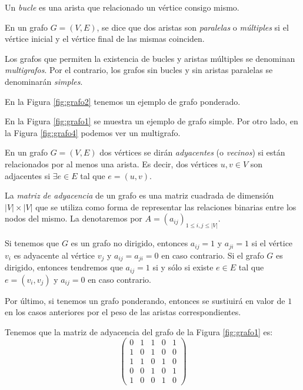 \begin{definition}
Un \emph{bucle} es una arista que relacionado un vértice consigo mismo.
\end{definition}

\begin{definition}
En un grafo $G=(V,E)$, se dice que dos aristas son \emph{paralelas} o \emph{múltiples} si el vértice inicial y el vértice final de las mismas coinciden. 

Los grafos que permiten la existencia de bucles y aristas múltiples se denominan \emph{multigrafos}. Por el contrario, los grafos sin bucles y sin aristas paralelas se denominarán \emph{simples}.
\end{definition}

\begin{exampleth}
En la Figura \ref{fig:grafo2} tenemos un ejemplo de grafo ponderado.

En la Figura \ref{fig:grafo1} se muestra un ejemplo de grafo simple. Por otro lado, en la Figura \ref{fig:grafo4} podemos ver un multigrafo.
\end{exampleth}

\begin{definition}\label{def:adjacency}
En un grafo $G=(V,E)$ dos vértices se dirán \emph{adyacentes} (o \emph{vecinos}) si están relacionados por al menos una arista. Es decir, dos vértices $u,v \in V$ son adjacentes si $\exists e \in E$ tal que $e = (u,v)$.

La \emph{matriz de adyacencia} de un grafo es una matriz cuadrada de dimensión $|V| \times |V|$ que se utiliza como forma de representar las relaciones binarias entre los nodos del mismo. La denotaremos por $A = (a_{ij})_{1\leq i,j\leq |V|}$.

Si tenemos que $G$ es un grafo no dirigido, entonces $a_{ij} = 1$ y $a_{ji} = 1$ si el vértice $v_i$ es adyacente al vértice $v_j$ y $a_{ij} = a_{ji} = 0$ en caso contrario. Si el grafo $G$ es dirigido, entonces tendremos que $a_{ij} = 1$ si y sólo si existe $e \in E$ tal que $e = (v_i,v_j)$ y $a_{ij} = 0$ en caso contrario.

Por último, si tenemos un grafo ponderando, entonces se sustiuirá en valor de $1$ en los casos anteriores por el peso de las aristas correspondientes.
\end{definition}

\begin{exampleth}
Tenemos que la matriz de adyacencia del grafo de la Figura \ref{fig:grafo1} es:
\begin{equation}
\begin{pmatrix}
0 & 1 & 1 & 0 & 1\\
1 & 0 & 1 & 0 & 0\\
1 & 1 & 0 & 1 & 0\\
0 & 0 & 1 & 0 & 1\\
1 & 0 & 0 & 1 & 0
\end{pmatrix}
\end{equation}
\end{exampleth}

